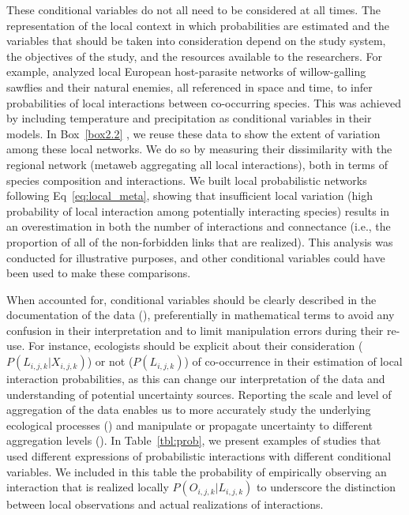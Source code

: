 These conditional variables do not all need to be considered at all times. The
representation of the local context in which probabilities are estimated and the
variables that should be taken into consideration depend on the study system,
the objectives of the study, and the resources available to the researchers. For
example, \textcite{Gravel2019Bringing} analyzed local European host-parasite
networks of willow-galling sawflies and their natural enemies, all referenced in
space and time, to infer probabilities of local interactions between
co-occurring species. This was achieved by including temperature and
precipitation as conditional variables in their models. In Box~\ref{box2.2} , we
reuse these data to show the extent of variation among these local networks. We
do so by measuring their dissimilarity with the regional network (metaweb
aggregating all local interactions), both in terms of species composition and
interactions. We built local probabilistic networks following
Eq~\ref{eq:local_meta}, showing that insufficient local variation (high
probability of local interaction among potentially interacting species) results
in an overestimation in both the number of interactions and connectance (i.e.,
the proportion of all of the non-forbidden links that are realized). This
analysis was conducted for illustrative purposes, and other conditional
variables could have been used to make these comparisons.

When accounted for, conditional variables should be clearly described in the
documentation of the data (\cite{Brimacombe2023Shortcomings}), preferentially in
mathematical terms to avoid any confusion in their interpretation and to limit
manipulation errors during their re-use. For instance, ecologists should be
explicit about their consideration  ($P(L_{i, j, k} | X_{i,j,k})$) or not
($P(L_{i, j, k})$) of co-occurrence in their estimation of local interaction
probabilities, as this can change our interpretation of the data and
understanding of potential uncertainty sources. Reporting the scale and level of
aggregation of the data enables us to more accurately study the underlying
ecological processes (\cite{Clark2011Individualscale}) and manipulate or
propagate uncertainty to different aggregation levels
(\cite{Simmonds2024Recommendations}). In Table~\ref{tbl:prob}, we present examples of
studies that used different expressions of probabilistic interactions with
different conditional variables. We included in this table the probability of
empirically observing an interaction that is realized locally $P(O_{i, j, k}
\vert L_{i, j, k})$ to underscore the distinction between local observations and
actual realizations of interactions.

